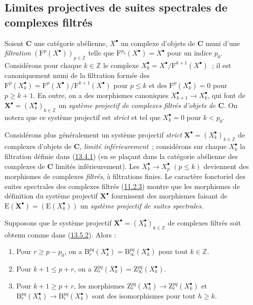 \subsection{Limites projectives de suites spectrales de complexes filtrés}
\label{subsection:0.13.5-fr}
\begin{env}[13.5.1]
\label{0.13.5.1-fr}
Soient $\boldsymbol{C}$ une catégorie abélienne, $X^\bullet$ un complexe d'objets de
$\boldsymbol{C}$ muni d'une \emph{filtration}
$(\mathrm F^p(X^\bullet))_{p\in\mathbb Z}$ telle que
$\mathrm F^{p_0}(X^\bullet)=X^\bullet$ pour un indice $p_0$.
Considérons pour chaque $k\in\mathbb Z$ le complexe
$X_k^\bullet=X^\bullet/\mathrm F^{k+1}(X^\bullet)$~; il est canoniquement
muni de la filtration formée des
$\mathrm F^p(X_k^\bullet)=
\mathrm F^p(X^\bullet)/\mathrm F^{k+1}(X^\bullet)$ pour $p\leq k$ et des
$\mathrm F^p(X_k^\bullet)=0$ pour $p\geq k+1$. En outre, on a des
morphismes canoniques $X_{k+1}^\bullet\to X_k^\bullet$, qui font de
$\mathbf X^\bullet=(X_k^\bullet)_{k\in\mathbb Z}$ un \emph{système
projectif de complexes filtrés d'objets de $\boldsymbol{C}$}. On notera que ce système
projectif est \emph{strict} et tel que $X_k^\bullet=0$ pour $k<p_0$.
\end{env}
\begin{env}[13.5.2]
\label{0.13.5.2-fr}
Considérons plus généralement un système projectif \emph{strict}
$\mathbf X^\bullet=(X_k^\bullet)_{k\in\mathbb Z}$ de complexes d'objets de
$\boldsymbol{C}$, \emph{limité inférieurement}~; considérons sur chaque
$X_k^\bullet$ la filtration définie dans
(\hyperref[0.13.4.1-fr]{13.4.1}) (en se plaçant dans la catégorie abélienne
des complexes de $\boldsymbol{C}$ limités inférieurement). Les
$X_k^\bullet\to X_p^\bullet$ $(p\leq k)$ deviennent des morphismes de
complexes \emph{filtrés}, à filtrations finies. Le caractère fonctoriel des
suites spectrales des complexes filtrés
(\hyperref[0.11.2.3-fr]{11.2.3}) montre que les morphismes de définition du
système projectif $\mathbf X^\bullet$ fournissent des morphismes faisant de
$\mathrm E(\mathbf X^\bullet)=(\mathrm E(X_k^\bullet))$ un \emph{système
projectif de suites spectrales}.
\end{env}
\begin{lemma}[13.5.3]
\label{0.13.5.3-fr}
Supposons que le système projectif
$\mathbf X^\bullet=(X_k^\bullet)_{k\in\mathbb Z}$ de complexes filtrés soit
obtenu comme dans \textup{(\hyperref[0.13.5.2-fr]{13.5.2})}. Alors :
\begin{enumerate}
\item[\emph{a)}]Pour $r\geq p-p_0$, on a
$\mathrm B_r^{pq}(X_k^\bullet)=\mathrm B_\infty^{pq}(X_k^\bullet)$ pour
tout $k\in\mathbb Z$.
\item[\emph{b)}]Pour $k+1\leq p+r$, on a
$\mathrm Z_r^{pq}(X_k^\bullet)=\mathrm Z_\infty^{pq}(X_k^\bullet)$.
\item[\emph{c)}]Pour $k+1\geq p+r$, les morphismes
$\mathrm Z_r^{pq}(X_h^\bullet)\to\mathrm Z_r^{pq}(X_k^\bullet)$ et
$\mathrm B_r^{pq}(X_h^\bullet)\to\mathrm B_r^{pq}(X_k^\bullet)$ sont des
isomorphismes pour tout $h\geq k$.
\end{enumerate}
\end{lemma}
